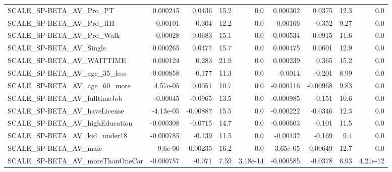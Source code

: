 \begin{tabular}{lrrrrrrrr}
SCALE\_SP-BETA\_AV\_Pro\_PT                            &    0.000245 &       0.0436 &     15.2 &      0.0 &   0.000302 &      0.0375 &         12.3 &           0.0 \\
SCALE\_SP-BETA\_AV\_Pro\_RH                            &    -0.00101 &       -0.304 &     12.2 &      0.0 &   -0.00166 &      -0.352 &         9.27 &           0.0 \\
SCALE\_SP-BETA\_AV\_Pro\_Walk                          &    -0.00028 &      -0.0683 &     15.1 &      0.0 &  -0.000534 &     -0.0915 &         11.6 &           0.0 \\
SCALE\_SP-BETA\_AV\_Single                            &    0.000265 &       0.0477 &     15.7 &      0.0 &   0.000475 &      0.0601 &         12.9 &           0.0 \\
SCALE\_SP-BETA\_AV\_WAITTIME                          &    0.000124 &        0.283 &     21.9 &      0.0 &   0.000239 &       0.365 &         15.2 &           0.0 \\
SCALE\_SP-BETA\_AV\_age\_35\_less                       &   -0.000858 &       -0.177 &     11.3 &      0.0 &    -0.0014 &      -0.201 &         8.99 &           0.0 \\
SCALE\_SP-BETA\_AV\_age\_60\_more                       &    4.57e-05 &       0.0051 &     10.7 &      0.0 &  -0.000116 &    -0.00968 &         9.83 &           0.0 \\
SCALE\_SP-BETA\_AV\_fulltimeJob                       &    -0.00045 &      -0.0965 &     13.5 &      0.0 &  -0.000985 &      -0.151 &         10.6 &           0.0 \\
SCALE\_SP-BETA\_AV\_haveLicense                       &   -4.13e-05 &     -0.00887 &     15.5 &      0.0 &  -0.000222 &     -0.0346 &         12.3 &           0.0 \\
SCALE\_SP-BETA\_AV\_highEducation                     &   -0.000308 &      -0.0715 &     14.7 &      0.0 &  -0.000603 &      -0.101 &         11.5 &           0.0 \\
SCALE\_SP-BETA\_AV\_kid\_under18                       &   -0.000785 &       -0.139 &     11.5 &      0.0 &   -0.00132 &      -0.169 &          9.4 &           0.0 \\
SCALE\_SP-BETA\_AV\_male                              &    -9.6e-06 &     -0.00235 &     16.2 &      0.0 &   3.65e-05 &     0.00649 &         12.7 &           0.0 \\
SCALE\_SP-BETA\_AV\_moreThanOneCar                    &   -0.000757 &       -0.071 &     7.59 & 3.18e-14 &  -0.000585 &     -0.0378 &         6.93 &      4.21e-12 \\

\end{tabular}
